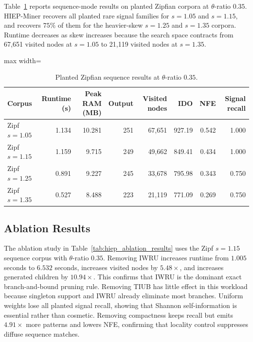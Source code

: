 \documentclass[11pt,a4paper]{article}
\begin{document}
Table~\ref{tab:hiep_zipf_results} reports sequence-mode results on planted Zipfian corpora at \(\theta\)-ratio \(0.35\). HIEP-Miner recovers all planted rare signal families for \(s=1.05\) and \(s=1.15\), and recovers \(75\%\) of them for the heavier-skew \(s=1.25\) and \(s=1.35\) corpora. Runtime decreases as skew increases because the search space contracts from 67,651 visited nodes at \(s=1.05\) to 21,119 visited nodes at \(s=1.35\).

\begin{table}[H]
\centering
\caption{Planted Zipfian sequence results at \(\theta\)-ratio \(0.35\).}
\label{tab:hiep_zipf_results}
\small
\begin{adjustbox}{max width=\textwidth}
\begin{tabular}{lrrrrrrr}
\toprule
Corpus & Runtime (s) & Peak RAM (MB) & Output & Visited nodes & IDO & NFE & Signal recall \\
\midrule
Zipf \(s=1.05\) & 1.134 & 10.281 & 251 & 67,651 & 927.19 & 0.542 & 1.000 \\
Zipf \(s=1.15\) & 1.159 & 9.715 & 249 & 49,662 & 849.41 & 0.434 & 1.000 \\
Zipf \(s=1.25\) & 0.891 & 9.227 & 245 & 33,678 & 795.98 & 0.343 & 0.750 \\
Zipf \(s=1.35\) & 0.527 & 8.488 & 223 & 21,119 & 771.09 & 0.269 & 0.750 \\
\bottomrule
\end{tabular}
\end{adjustbox}
\end{table}

\subsection{Ablation Results}

The ablation study in Table~\ref{tab:hiep_ablation_results} uses the Zipf \(s=1.15\) sequence corpus with \(\theta\)-ratio \(0.35\). Removing IWRU increases runtime from \(1.005\) seconds to \(6.532\) seconds, increases visited nodes by \(5.48\times\), and increases generated children by \(10.94\times\). This confirms that IWRU is the dominant exact branch-and-bound pruning rule. Removing TIUB has little effect in this workload because singleton support and IWRU already eliminate most branches. Uniform weights lose all planted signal recall, showing that Shannon self-information is essential rather than cosmetic. Removing compactness keeps recall but emits \(4.91\times\) more patterns and lowers NFE, confirming that locality control suppresses diffuse sequence matches.
\end{document}
